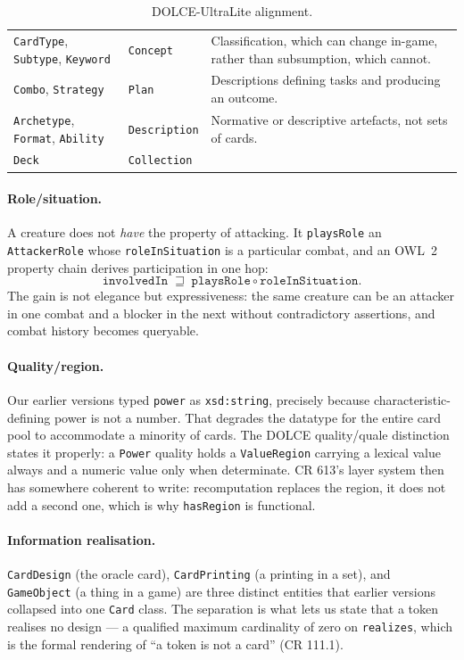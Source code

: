 \documentclass[11pt,a4paper]{article}
\begin{document}
\begin{table}[t]
\begin{tabular}{@{}p{} p{} p{}@{}}
\texttt{CardType}, \texttt{Subtype}, \texttt{Keyword} & \texttt{Concept} & Classification, which can change in-game, rather than subsumption, which cannot. \\
\texttt{Combo}, \texttt{Strategy} & \texttt{Plan} & Descriptions defining tasks and producing an outcome. \\
\texttt{Archetype}, \texttt{Format}, \texttt{Ability} & \texttt{Description} & Normative or descriptive artefacts, not sets of cards. \\
\texttt{Deck} & \texttt{Collection} & \\
\bottomrule
\end{tabular}
\caption{DOLCE-UltraLite alignment.}
\label{tab:dolce}
\end{table}

\paragraph{Role/situation.} A creature does not \emph{have} the property of attacking. It \texttt{playsRole} an \texttt{AttackerRole} whose \texttt{roleInSituation} is a particular combat, and an OWL~2 property chain derives participation in one hop:
\[
\texttt{involvedIn} \;\sqsupseteq\; \texttt{playsRole} \circ \texttt{roleInSituation}.
\]
The gain is not elegance but expressiveness: the same creature can be an attacker in one combat and a blocker in the next without contradictory assertions, and combat history becomes queryable.

\paragraph{Quality/region.} Our earlier versions typed \texttt{power} as \texttt{xsd:string}, precisely because characteristic-defining power is not a number. That degrades the datatype for the entire card pool to accommodate a minority of cards. The DOLCE quality/quale distinction states it properly: a \texttt{Power} quality holds a \texttt{ValueRegion} carrying a lexical value always and a numeric value only when determinate. CR 613's layer system then has somewhere coherent to write: recomputation replaces the region, it does not add a second one, which is why \texttt{hasRegion} is functional.

\paragraph{Information realisation.} \texttt{CardDesign} (the oracle card), \texttt{CardPrinting} (a printing in a set), and \texttt{GameObject} (a thing in a game) are three distinct entities that earlier versions collapsed into one \texttt{Card} class. The separation is what lets us state that a token realises no design --- a qualified maximum cardinality of zero on \texttt{realizes}, which is the formal rendering of ``a token is not a card'' (CR 111.1).
\end{document}
